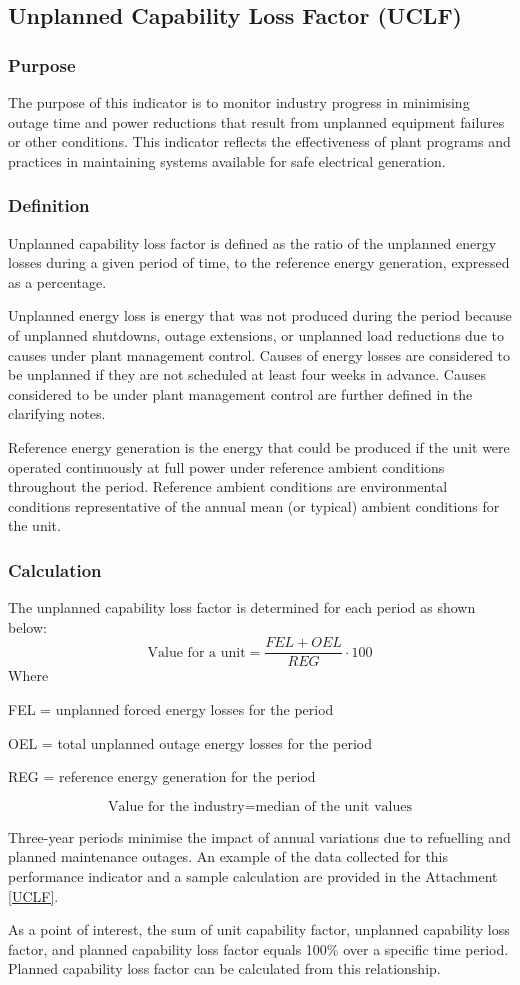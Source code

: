 \subsection{Unplanned Capability Loss Factor (UCLF)}

\subsubsection{Purpose}

The purpose of this indicator is to monitor industry progress in
minimising outage time and power reductions that result from unplanned
equipment failures or other conditions. This indicator reflects the
effectiveness of plant programs and practices in maintaining systems
available for safe electrical generation.

\subsubsection{Definition}
Unplanned capability loss factor is defined as the ratio of the
unplanned energy losses during a given period of time, to the
reference energy generation, expressed as a percentage.

Unplanned energy loss is energy that was not produced during the
period because of unplanned shutdowns, outage extensions, or unplanned
load reductions due to causes under plant management control. Causes
of energy losses are considered to be unplanned if they are not
scheduled at least four weeks in advance. Causes considered to be
under plant management control are further defined in the clarifying
notes.

Reference energy generation is the energy that could be produced if
the unit were operated continuously at full power under reference
ambient conditions throughout the period. Reference ambient conditions
are environmental conditions representative of the annual mean (or
typical) ambient conditions for the unit.

\subsubsection{Calculation}
The unplanned capability loss factor is determined for each period as shown below:
$$ \text{Value for a unit}  =  \frac{FEL+OEL}{REG} \cdot 100 $$
Where

FEL  = unplanned forced energy losses for the period

OEL = total unplanned outage energy losses for the period

REG = reference energy generation for the period

$$ \text{Value for the industry}  = \text{median of the unit values} $$

Three-year periods minimise the impact of annual variations due to
refuelling and planned maintenance outages. An example of the data
collected for this performance indicator and a sample calculation are
provided in the Attachment \ref{UCLF}.

As a point of interest, the sum of unit capability factor, unplanned capability loss factor, and planned capability loss factor equals 100\% over a specific time period. Planned capability loss factor can be calculated from this relationship.
